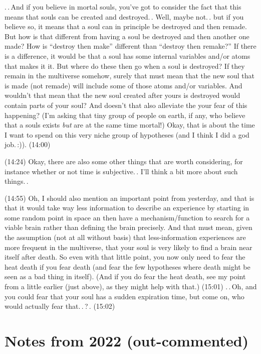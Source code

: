 \documentclass{report}
\begin{document}
.\,.\,And if you believe in mortal souls, you've got to consider the fact that this means that souls can be created and destroyed.\,. Well, maybe not.\,. but if you believe so, it means that a soul can in principle be destroyed and then remade. But how is that different from having a soul be destroyed and then another one made? How is ``destroy then make'' different than ``destroy then remake?'' If there is a difference, it would be that a soul has some internal variables and/or atoms that makes it it. But where do these then go when a soul is destroyed? If they remain in the multiverse somehow, surely that must mean that the new soul that is made (not remade) will include some of those atoms and/or variables. And wouldn't that mean that the new soul created after yours is destroyed would contain parts of your soul? And doesn't that also alleviate the your fear of this happening? (I'm asking that tiny group of people on earth, if any, who believe that a souls exists \emph{but} are at the same time mortal!) Okay, that is about the time I want to spend on this very niche group of hypotheses (and I think I did a god job.\,:)). (14:00)

(14:24) Okay, there are also some other things that are worth considering, for instance whether or not time is subjective.\,. I'll think a bit more about such things.\,.

(14:55) Oh, I should also mention an important point from yesterday, and that is that it would take way less information to describe an experience by starting in some random point in space an then have a mechanism/function to search for a viable brain rather than defining the brain precisely. And that must mean, given the assumption (not at all without basis) that less-information experiences are more frequent in the multiverse, that your soul is very likely to find a brain near itself after death. So even with that little point, you now only need to fear the heat death if you fear death (and fear the few hypotheses where death might be seen as a bad thing in itself). (And if you do fear the heat death, see my point from a little earlier (just above), as they might help with that.) (15:01) .\,.\,Oh, and you could fear that your soul has a sudden expiration time, but come on, who would actually fear that.\,.\,?\,. (15:02)








\chapter{Notes from 2022 (out-commented)} \label{notes_from_2022}
\end{document}
